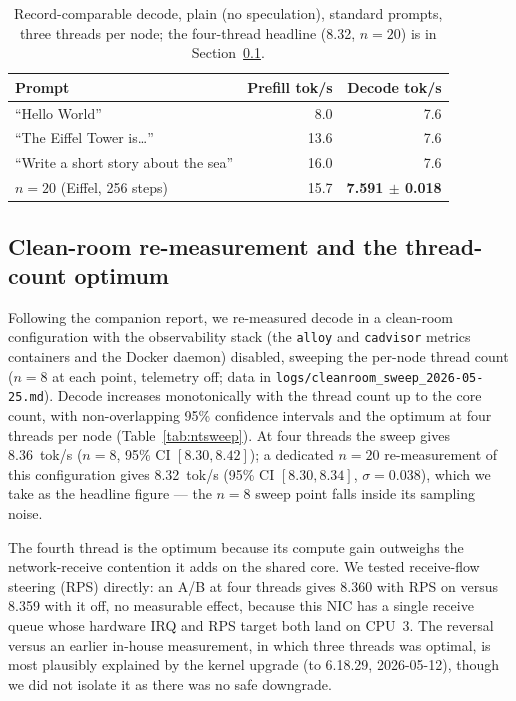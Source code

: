 \documentclass[10pt,a4paper]{article}
\begin{document}
\begin{table}[H]
\centering\small
\caption{Record-comparable decode, plain (no speculation), standard prompts, three threads per node; the four-thread headline (8.32, $n{=}20$) is in Section~\ref{sec:cleanroom}.}
\label{tab:headline}
\begin{tabular}{@{}lrr@{}}
\toprule
\textbf{Prompt} & \textbf{Prefill tok/s} & \textbf{Decode tok/s} \\
\midrule
``Hello World'' & 8.0 & 7.6 \\
``The Eiffel Tower is\ldots'' & 13.6 & 7.6 \\
``Write a short story about the sea'' & 16.0 & 7.6 \\
\midrule
$n{=}20$ (Eiffel, 256 steps) & 15.7 & \textbf{7.591 $\pm$ 0.018} \\
\bottomrule
\end{tabular}
\end{table}

\subsection{Clean-room re-measurement and the thread-count optimum}
\label{sec:cleanroom}
Following the companion report, we re-measured decode in a clean-room configuration with the observability stack (the \texttt{alloy} and \texttt{cadvisor} metrics containers and the Docker daemon) disabled, sweeping the per-node thread count ($n{=}8$ at each point, telemetry off; data in \texttt{logs/cleanroom\_sweep\_2026-05-25.md}). Decode increases monotonically with the thread count up to the core count, with non-overlapping 95\% confidence intervals and the optimum at four threads per node (Table~\ref{tab:ntsweep}). At four threads the sweep gives 8.36~tok/s ($n{=}8$, 95\% CI $[8.30, 8.42]$); a dedicated $n{=}20$ re-measurement of this configuration gives 8.32~tok/s (95\% CI $[8.30, 8.34]$, $\sigma=0.038$), which we take as the headline figure --- the $n{=}8$ sweep point falls inside its sampling noise.

The fourth thread is the optimum because its compute gain outweighs the network-receive contention it adds on the shared core. We tested receive-flow steering (RPS) directly: an A/B at four threads gives 8.360 with RPS on versus 8.359 with it off, no measurable effect, because this NIC has a single receive queue whose hardware IRQ and RPS target both land on CPU~3. The reversal versus an earlier in-house measurement, in which three threads was optimal, is most plausibly explained by the kernel upgrade (to 6.18.29, 2026-05-12), though we did not isolate it as there was no safe downgrade.
\end{document}
